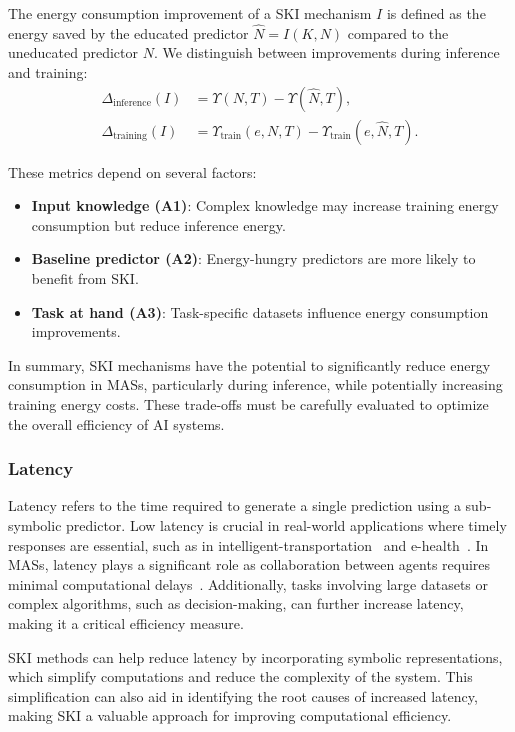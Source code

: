 %
The energy consumption improvement of a \gls{SKI} mechanism \(I\) is defined as the energy saved by the educated predictor \(\hat{N} = I(K, N)\) compared to the uneducated predictor \(N\).
%
We distinguish between improvements during inference and training:
%
\begin{align}
    \Delta_{\text{inference}}(I) &= \Upsilon(N, T) - \Upsilon(\hat{N}, T), \\
    \Delta_{\text{training}}(I) &= \Upsilon_{\text{train}}(e, N, T) - \Upsilon_{\text{train}}(e, \hat{N}, T).
\end{align}

%
These metrics depend on several factors:
%
\begin{itemize}
    \item \textbf{Input knowledge (\gls{A1})}: Complex knowledge may increase training energy consumption but reduce inference energy.
    \item \textbf{Baseline predictor (\gls{A2})}: Energy-hungry predictors are more likely to benefit from \gls{SKI}.
    \item \textbf{Task at hand (\gls{A3})}: Task-specific datasets influence energy consumption improvements.
\end{itemize}

%
In summary, \gls{SKI} mechanisms have the potential to significantly reduce energy consumption in \glspl{MAS}, particularly during inference, while potentially increasing training energy costs.
%
These trade-offs must be carefully evaluated to optimize the overall efficiency of \gls{AI} systems.


\subsubsection{Latency}\label{subsubsec:ski-meets-intelligent-agents-latency}
%
Latency refers to the time required to generate a single prediction using a sub-symbolic predictor.
%
Low latency is crucial in real-world applications where timely responses are essential, such as in \gls{intelligent-transportation}~\cite{CITATION} and \gls{e-health}~\cite{CITATION}.
%
In \glspl{MAS}, latency plays a significant role as collaboration between agents requires minimal computational delays~\cite{CITATION}.
%
Additionally, tasks involving large datasets or complex algorithms, such as decision-making, can further increase latency, making it a critical efficiency measure.

%
\gls{SKI} methods can help reduce latency by incorporating symbolic representations, which simplify computations and reduce the complexity of the system.
%
This simplification can also aid in identifying the root causes of increased latency, making \gls{SKI} a valuable approach for improving computational efficiency.

